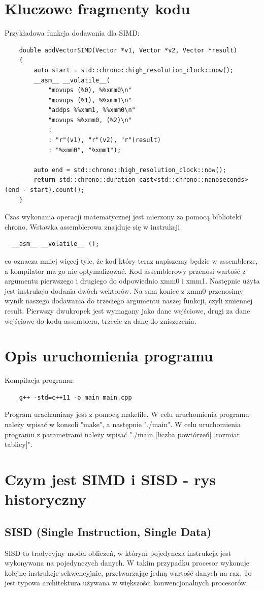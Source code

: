 \documentclass[11pt]{article}
\begin{document}
\section{Kluczowe fragmenty kodu}
Przykładowa funkcja dodawania dla SIMD:
\begin{verbatim}
    double addVectorSIMD(Vector *v1, Vector *v2, Vector *result)
    {
        auto start = std::chrono::high_resolution_clock::now();
        __asm__ __volatile__(
            "movups (%0), %%xmm0\n"
            "movups (%1), %%xmm1\n"
            "addps %%xmm1, %%xmm0\n"
            "movups %%xmm0, (%2)\n"
            :
            : "r"(v1), "r"(v2), "r"(result)
            : "%xmm0", "%xmm1");
    
        auto end = std::chrono::high_resolution_clock::now();
        return std::chrono::duration_cast<std::chrono::nanoseconds>(end - start).count();
    }
\end{verbatim}
Czas wykonania operacji matematycznej jest mierzony za pomocą biblioteki chrono. Wstawka assemblerowa znajduje się w instrukcji\begin{verbatim}  __asm__ __volatile__ ();\end{verbatim} co oznacza mniej więcej tyle, że kod który teraz napiszemy będzie w assemblerze, a kompilator ma go nie optymalizować.
Kod assemblerowy przenosi wartość z argumentu pierwszego i drugiego do odpowiednio xmm0 i xmm1. Następnie użyta jest instrukcja dodania dwóch wektorów. Na sam koniec z xmm0 przenosimy wynik naszego dodawania do trzeciego argumentu naszej funkcji, czyli zmiennej result.
Pierwszy dwukropek jest wymagany jako dane wejściowe, drugi za dane wejściowe do kodu assemblera, trzecie za dane do zniszczenia.
\section{Opis uruchomienia programu}
Kompilacja programu:
\begin{verbatim}
    g++ -std=c++11 -o main main.cpp
\end{verbatim}
Program urachamiany jest z pomocą makefile. W celu uruchomienia programu należy wpisać w konsoli "make", a następnie "./main". W celu uruchomienia programu z parametrami należy wpisać "./main [liczba powtórzeń] [rozmiar tablicy]".
\section{Czym jest SIMD i SISD - rys historyczny}
\subsection{SISD (Single Instruction, Single Data)}
SISD to tradycyjny model obliczeń, w którym pojedyncza instrukcja jest wykonywana na pojedynczych danych. W takim przypadku procesor wykonuje kolejne instrukcje sekwencyjnie, przetwarzając jedną wartość danych na raz. To jest typowa architektura używana w większości konwencjonalnych procesorów.
\end{document}
